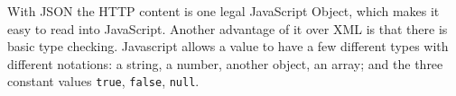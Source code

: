 With JSON the HTTP content is one legal JavaScript Object, which makes it easy
to read into JavaScript. Another advantage of it over XML is that there is basic
type checking. Javascript allows a value to have a few different types with
different notations: a string, a number, another object, an array; and the three
constant values \verb;true;, \verb;false;,
\verb;null;.\cite{website:json-guide,website:json}
